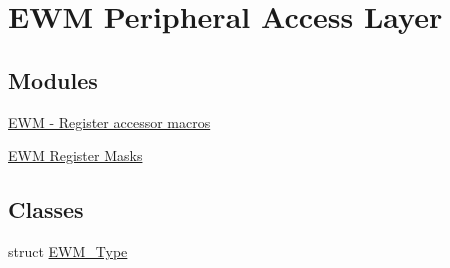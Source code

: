 \hypertarget{group__EWM__Peripheral__Access__Layer}{}\section{E\+WM Peripheral Access Layer}
\label{group__EWM__Peripheral__Access__Layer}
\subsection*{Modules}
\begin{DoxyCompactItemize}
\item 
\hyperlink{group__EWM__Register__Accessor__Macros}{E\+W\+M -\/ Register accessor macros}
\item 
\hyperlink{group__EWM__Register__Masks}{E\+W\+M Register Masks}
\end{DoxyCompactItemize}
\subsection*{Classes}
\begin{DoxyCompactItemize}
\item 
struct \hyperlink{structEWM__Type}{E\+W\+M\+\_\+\+Type}
\end{DoxyCompactItemize}
